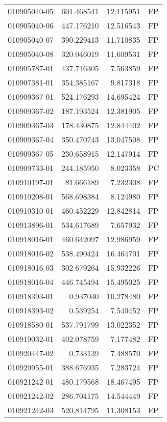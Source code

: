 \begin{tabular}{lrrl}
010905040-05 &  601.468541 &    12.115951 &   FP \\
010905040-06 &  447.176210 &    12.516543 &   FP \\
010905040-07 &  390.229413 &    11.710835 &   FP \\
010905040-08 &  320.046019 &    11.609531 &   FP \\
010905787-01 &  437.716305 &     7.563859 &   FP \\
010907381-01 &  354.385167 &     9.817318 &   FP \\
010909367-01 &  524.176293 &    14.695424 &   FP \\
010909367-02 &  187.193524 &    12.381905 &   FP \\
010909367-03 &  178.430875 &    12.844402 &   FP \\
010909367-04 &  350.470743 &    13.047508 &   FP \\
010909367-05 &  230.658915 &    12.147914 &   FP \\
010909733-01 &  244.185950 &     8.023358 &   PC \\
010910197-01 &   81.666189 &     7.232308 &   FP \\
010910208-01 &  568.698384 &     8.124980 &   FP \\
010910310-01 &  460.452229 &    12.842814 &   FP \\
010913896-01 &  534.617689 &     7.657932 &   FP \\
010918016-01 &  460.642097 &    12.986959 &   FP \\
010918016-02 &  538.490424 &    16.464701 &   FP \\
010918016-03 &  302.679264 &    15.932226 &   FP \\
010918016-04 &  446.745494 &    15.495025 &   FP \\
010918393-01 &    0.937030 &    10.278480 &   FP \\
010918393-02 &    0.539254 &     7.540452 &   FP \\
010918580-01 &  537.791799 &    13.022352 &   FP \\
010919032-01 &  402.078759 &     7.177482 &   FP \\
010920447-02 &    0.733139 &     7.488570 &   FP \\
010920955-01 &  388.676935 &     7.283724 &   FP \\
010921242-01 &  480.179568 &    18.467495 &   FP \\
010921242-02 &  286.704175 &    14.544449 &   FP \\
010921242-03 &  520.814795 &    11.308153 &   FP \\

\end{tabular}
